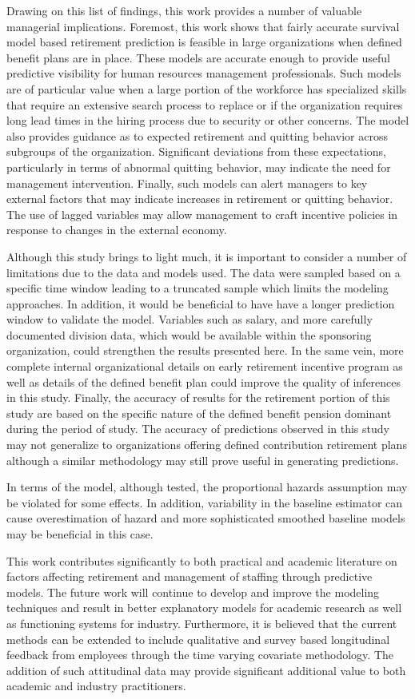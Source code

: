 Drawing on this list of findings, this work provides a number of valuable managerial implications.  Foremost, this work shows that fairly accurate survival model based retirement prediction is feasible in large organizations when defined benefit plans are in place.  These models are accurate enough to provide useful predictive visibility for human resources management professionals.  Such models are of particular value when a large portion of the workforce has specialized skills that require an extensive search process to replace or if the organization requires long lead times in the hiring process due to security or other concerns.  The model also provides guidance as to expected retirement and quitting behavior across subgroups of the organization. Significant deviations from these expectations, particularly  in terms of  abnormal quitting behavior, may indicate the need for management intervention.  Finally, such models can alert managers to key external factors that may indicate increases in retirement or quitting behavior.  The use of lagged variables may allow management to craft incentive policies in response to changes in the external economy.

Although this study brings to light much, it is important to consider a number of limitations due to the data and models used.  The data were sampled based on a specific time window leading to a truncated sample which limits the modeling approaches.  In addition,  it would be beneficial to have have a longer prediction window to validate the model.  Variables such as salary, and more carefully documented division data, which would be available within the sponsoring organization, could strengthen the results presented here.  In the same vein, more complete internal organizational details on early retirement incentive program as well as details of the defined benefit plan could improve the quality of inferences in this study.  Finally, the accuracy of results for the retirement portion of this study are based on the specific nature of the defined benefit pension dominant during the period of study.  The accuracy of predictions observed in this study may not generalize to organizations offering defined contribution retirement plans although a similar methodology may still prove useful in generating predictions.


In terms of the model, although tested, the proportional hazards assumption may be violated for some effects.  In addition, variability in the baseline estimator can cause overestimation of hazard and more sophisticated smoothed baseline models may be beneficial in this case.

This work contributes significantly to both practical and academic literature on factors affecting retirement and management of staffing through predictive models. The future work will continue to develop and improve the modeling techniques and result in better explanatory models for academic research as well as functioning systems for industry.  Furthermore, it is believed that the current methods can be extended to include qualitative and survey based longitudinal feedback from employees through the time varying covariate methodology.  The addition of such attitudinal data may provide significant additional value to both academic and industry practitioners.